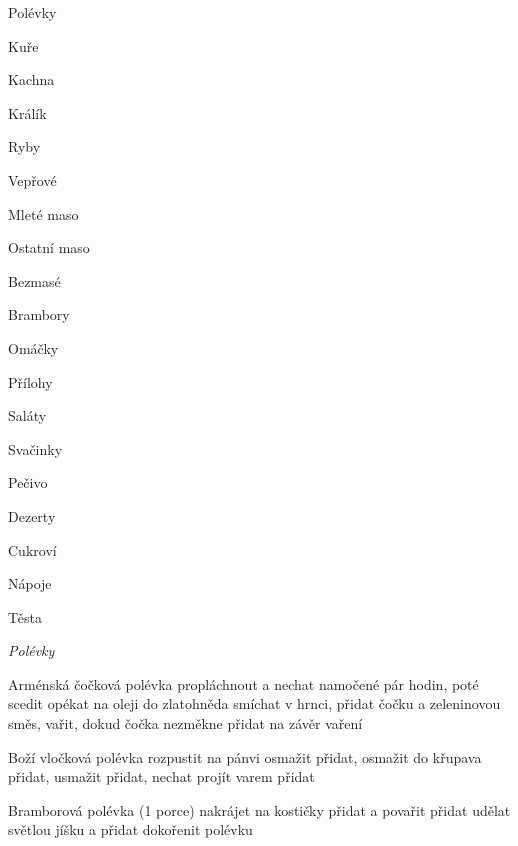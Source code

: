 \documentclass[12pt,a4paper]{article}
\begin{document}
\vspace*{\fill}
{\Huge\it
\centerline{Polévky}
\centerline{Kuře}
\centerline{Kachna}
\centerline{Králík}
\centerline{Ryby}
\centerline{Vepřové}
\centerline{Mleté maso}
\centerline{Ostatní maso}
\centerline{Bezmasé}
\centerline{Brambory}
\centerline{Omáčky}
\centerline{Přílohy}
\centerline{Saláty}
\centerline{Svačinky}
\centerline{Pečivo}
\centerline{Dezerty}
\centerline{Cukroví}
\centerline{Nápoje}
\centerline{Těsta}
}
\vspace*{\fill}
\newpage

\vspace*{\fill}
\hfill {\Huge\it Polévky}\hfill
\vspace*{\fill}
\newpage

\begin{recipe}{Arménská čočková polévka}
   propláchnout a nechat namočené pár hodin, poté scedit
   opékat na oleji do zlatohněda
   smíchat v hrnci, přidat čočku a zeleninovou směs, vařit, dokud čočka nezměkne
   přidat na závěr vaření
\end{recipe}
\newpage

\begin{recipe}{Boží vločková polévka}
    rozpustit na pánvi
    osmažit
    přidat, osmažit do křupava
    přidat, usmažit
    přidat, nechat projít varem
    přidat
\end{recipe}
\newpage

\begin{recipe}{Bramborová polévka (1 porce)}
   nakrájet na kostičky
   přidat a povařit
   přidat
   udělat světlou jíšku a přidat
   dokořenit polévku
\end{recipe}
\newpage
\end{document}
